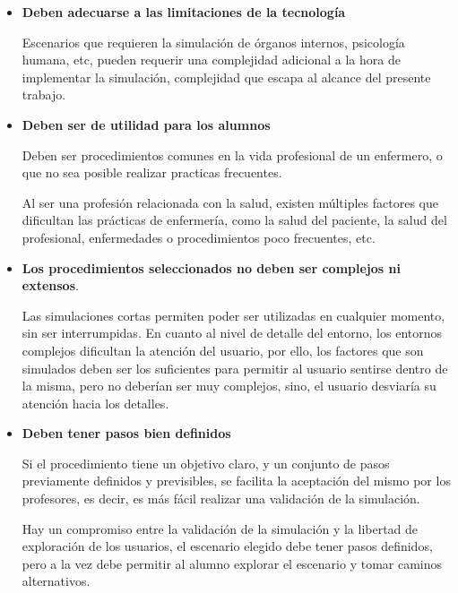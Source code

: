 \begin{itemize}

    \item \textbf{Deben adecuarse a las limitaciones de la tecnología} 

    Escenarios que requieren la simulación de órganos internos, psicología
    humana, etc, pueden requerir una complejidad adicional a la hora de
    implementar la simulación, complejidad que escapa al alcance del
    presente trabajo.

    \item \textbf{Deben ser de utilidad para los alumnos} 

    
    Deben ser procedimientos comunes en la vida profesional de un enfermero, o
    que no sea posible realizar practicas frecuentes. 

    Al ser una profesión relacionada con la salud, existen múltiples factores
    que dificultan las prácticas de enfermería, como la salud del paciente, la
    salud del profesional, enfermedades o procedimientos poco frecuentes, etc.

\item \textbf{Los procedimientos seleccionados no deben ser complejos ni
        extensos}. 

    Las simulaciones cortas permiten poder ser utilizadas en cualquier momento,
    sin ser interrumpidas. En cuanto al nivel de detalle del entorno, los
    entornos complejos dificultan la atención del
    usuario\cite{videojuegos:gonzaleztardon}, por ello, los factores que son
    simulados deben ser los suficientes para permitir al usuario sentirse dentro
    de la misma, pero no deberían ser muy complejos, sino, el usuario desviaría su
    atención hacia los detalles.

\item \textbf{Deben tener pasos bien definidos}
    
    Si el procedimiento tiene un objetivo claro, y un conjunto de pasos
    previamente definidos y previsibles, se facilita la aceptación del mismo por
    los profesores, es decir, es más fácil realizar una validación de la
    simulación.

    Hay un compromiso entre la validación de la simulación y la libertad de
    exploración de los usuarios, el escenario elegido debe tener pasos
    definidos, pero a la vez debe permitir al alumno explorar el escenario y
    tomar caminos alternativos.


\end{itemize}
